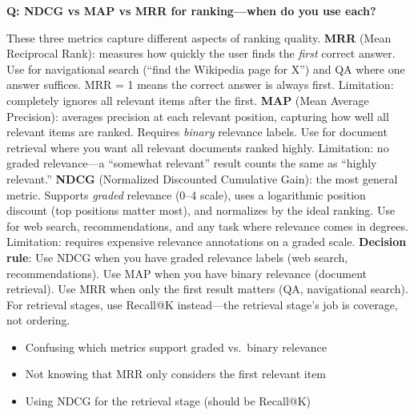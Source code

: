 \begin{interviewq}
\end{interviewq}

\begin{interviewq}
\textbf{Q: NDCG vs MAP vs MRR for ranking---when do you use each?}

 \quad {} \quad \badgefreq{\freqhigh}

\stronganswer These three metrics capture different aspects of ranking quality. \textbf{MRR} (Mean Reciprocal Rank): measures how quickly the user finds the \textit{first} correct answer. Use for navigational search (``find the Wikipedia page for X'') and QA where one answer suffices. MRR = 1 means the correct answer is always first. Limitation: completely ignores all relevant items after the first. \textbf{MAP} (Mean Average Precision): averages precision at each relevant position, capturing how well all relevant items are ranked. Requires \textit{binary} relevance labels. Use for document retrieval where you want all relevant documents ranked highly. Limitation: no graded relevance---a ``somewhat relevant'' result counts the same as ``highly relevant.'' \textbf{NDCG} (Normalized Discounted Cumulative Gain): the most general metric. Supports \textit{graded} relevance (0--4 scale), uses a logarithmic position discount (top positions matter most), and normalizes by the ideal ranking. Use for web search, recommendations, and any task where relevance comes in degrees. Limitation: requires expensive relevance annotations on a graded scale. \textbf{Decision rule}: Use NDCG when you have graded relevance labels (web search, recommendations). Use MAP when you have binary relevance (document retrieval). Use MRR when only the first result matters (QA, navigational search). For retrieval stages, use Recall@K instead---the retrieval stage's job is coverage, not ordering.

\redflags
\begin{itemize}
    \item Confusing which metrics support graded vs.\ binary relevance
    \item Not knowing that MRR only considers the first relevant item
    \item Using NDCG for the retrieval stage (should be Recall@K)
\end{itemize}



\end{interviewq}
